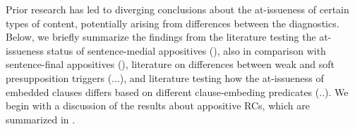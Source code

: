 \documentclass[times,linguex,xcolor]{glossa}
\begin{document}
  Prior research has led to diverging conclusions about the at-issueness of certain types of content, potentially arising from differences between the diagnostics. Below, we briefly summarize the findings from the literature testing the at-issueness status of sentence-medial appositives (\citealt{tonhauser_diagnosing_2012,syrett_experimental_2015,koev_notions_2018}), also in comparison with sentence-final appositives (\citealt{syrett_experimental_2015}), literature on differences between weak and soft presupposition triggers (\citealt{xue_correlation_2011,cummins_backgrounding_2013}...), and literature testing how the at-issueness of embedded clauses differs based on different clause-embeding predicates (\citealt{xue_correlation_2011,tonhauser_how_2018}..). We begin with a discussion of the results about appositive RCs, which are summarized in .
\end{document}

